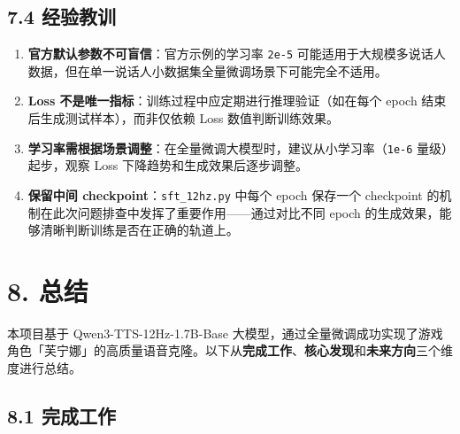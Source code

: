 \documentclass[
  english,
  letterpaper,
  DIV=11,
  numbers=noendperiod]{scrartcl}
\providecommand{\tightlist}{%
  \setlength{\itemsep}{0pt}\setlength{\parskip}{0pt}}
\begin{document}
\subsection{7.4 经验教训}\label{ux7ecfux9a8cux6559ux8bad}

\begin{enumerate}
\def\labelenumi{\arabic{enumi}.}
\tightlist
\item
  \textbf{官方默认参数不可盲信}：官方示例的学习率 \texttt{2e-5}
  可能适用于大规模多说话人数据，但在单一说话人小数据集全量微调场景下可能完全不适用。
\item
  \textbf{Loss 不是唯一指标}：训练过程中应定期进行推理验证（如在每个
  epoch 结束后生成测试样本），而非仅依赖 Loss 数值判断训练效果。
\item
  \textbf{学习率需根据场景调整}：在全量微调大模型时，建议从小学习率（\texttt{1e-6}
  量级）起步，观察 Loss 下降趋势和生成效果后逐步调整。
\item
  \textbf{保留中间 checkpoint}：\texttt{sft\_12hz.py} 中每个 epoch
  保存一个 checkpoint
  的机制在此次问题排查中发挥了重要作用------通过对比不同 epoch
  的生成效果，能够清晰判断训练是否在正确的轨道上。
\end{enumerate}

\section{8. 总结}\label{sec-summary}

本项目基于 Qwen3-TTS-12Hz-1.7B-Base
大模型，通过全量微调成功实现了游戏角色「芙宁娜」的高质量语音克隆。以下从\textbf{完成工作}、\textbf{核心发现}和\textbf{未来方向}三个维度进行总结。

\subsection{8.1 完成工作}\label{ux5b8cux6210ux5de5ux4f5c}
\end{document}
